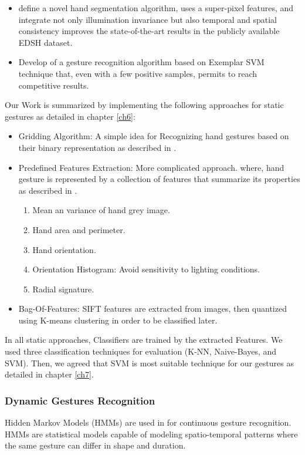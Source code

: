 \begin{itemize}
\item define a novel hand segmentation algorithm, uses a super-pixel features, and integrate not only illumination invariance but also temporal and spatial consistency improves the state-of-the-art results in the publicly available EDSH dataset.
\item Develop of a gesture recognition algorithm based on Exemplar SVM technique that, even with a few positive samples, permits to reach competitive results.
\end{itemize}
\bigskip

Our Work is summarized by implementing the following approaches for static gestures as detailed in chapter \ref{ch6}:
\begin{itemize}
\item Gridding Algorithm: A simple idea for Recognizing hand gestures based on their binary representation as described in \cite{paper1sb}.
\bigskip

\item Predefined Features Extraction: More complicated approach. where, hand gesture is represented by a collection of features that summarize its properties as described in \cite{paper2sT}.
\begin{enumerate}
\item Mean an variance of hand grey image.
\item Hand area and perimeter.
\item Hand orientation.
\item Orientation Histogram: Avoid sensitivity to lighting conditions. 
\item Radial signature.
\end{enumerate}
\bigskip

\item Bag-Of-Features: SIFT features are extracted from images, then quantized using K-means clustering in order to be classified later.
\end{itemize}
\bigskip

In all static approaches, Classifiers are trained by the extracted Features. 
We used three classification techniques for evaluation (K-NN, Naive-Bayes, and SVM). Then, we agreed that SVM is most suitable technique for our gestures as detailed in chapter \ref{ch7}.

\subsubsection{Dynamic Gestures Recognition} 
Hidden Markov Models (HMMs) are used in \cite{hoda} for continuous gesture recognition. HMMs are statistical models capable of modeling spatio-temporal patterns where the same gesture can differ in shape and duration.
\bigskip

